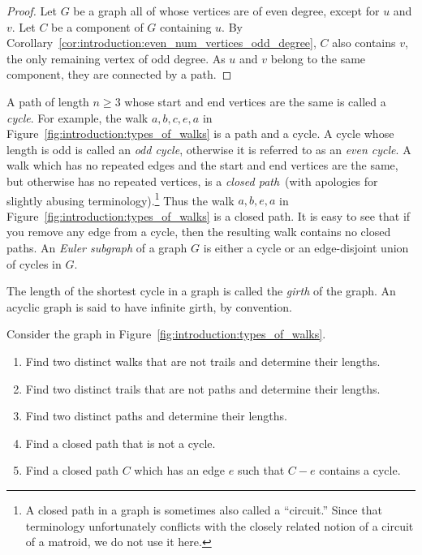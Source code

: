 \begin{proof}
Let $G$ be a graph all of whose vertices are of even degree, except
for $u$ and $v$. Let $C$ be a component of $G$ containing $u$. By
Corollary~\ref{cor:introduction:even_num_vertices_odd_degree}, $C$
also contains $v$, the only remaining vertex of odd degree. As $u$ and
$v$ belong to the same component, they are connected by a path.
\end{proof}

A path of length $n \geq 3$ whose start and end vertices are the same
is called a \emph{cycle}. For example, the walk $a, b, c, e, a$
in Figure~\ref{fig:introduction:types_of_walks} is a path and a
cycle. A cycle whose length is odd is called an
\emph{odd cycle}, otherwise it is referred to as an
\emph{even cycle}. A walk which has no repeated
edges and the start and end vertices are the same, but otherwise has
no repeated vertices, is
a \emph{closed path}~(with apologies for slightly abusing
terminology).\footnote{
A closed path in a graph is sometimes also called a ``circuit.'' Since
that terminology unfortunately conflicts with the closely related
notion of a circuit of a matroid, we do not use it here.}
Thus the walk $a, b, e, a$ in
Figure~\ref{fig:introduction:types_of_walks} is a closed path. It is
easy to see that if you remove any edge from a cycle, then the
resulting walk contains no closed paths. An \emph{Euler subgraph} of a
graph $G$ is either a cycle or an edge-disjoint union of cycles in
$G$.

The length of the shortest cycle in a graph is called the \emph{girth}
of the graph. An acyclic graph is said to have infinite girth, by
convention.

\begin{example}
\label{eg:introduction:walks_paths_trails}
Consider the graph in Figure~\ref{fig:introduction:types_of_walks}.
%
\begin{enumerate}
\item Find two distinct walks that are not trails and determine their
  lengths.

\item Find two distinct trails that are not paths and determine their
  lengths.

\item Find two distinct paths and determine their lengths.

\item Find a closed path that is not a cycle.

\item Find a closed path $C$ which has an edge $e$ such that $C - e$
  contains a cycle.
\end{enumerate}
\end{example}

